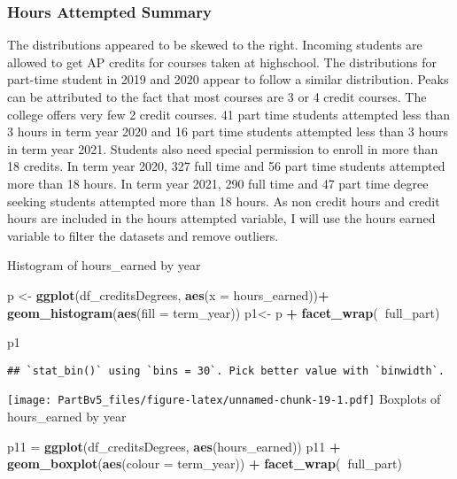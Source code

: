 \documentclass[]{article}
\newenvironment{Shaded}{\begin{snugshade}}{\end{snugshade}}
\newcommand{\DataTypeTok}[1]{\textcolor[rgb]{0.13,0.29,0.53}{#1}}
\newcommand{\KeywordTok}[1]{\textcolor[rgb]{0.13,0.29,0.53}{\textbf{#1}}}
\newcommand{\NormalTok}[1]{#1}
\newcommand{\OperatorTok}[1]{\textcolor[rgb]{0.81,0.36,0.00}{\textbf{#1}}}
\newcommand{\StringTok}[1]{\textcolor[rgb]{0.31,0.60,0.02}{#1}}
\begin{document}
\hypertarget{hours-attempted-summary}{%
\subsubsection{Hours Attempted Summary}\label{hours-attempted-summary}}

The distributions appeared to be skewed to the right. Incoming students
are allowed to get AP credits for courses taken at highschool. The
distributions for part-time student in 2019 and 2020 appear to follow a
similar distribution. Peaks can be attributed to the fact that most
courses are 3 or 4 credit courses. The college offers very few 2 credit
courses. 41 part time students attempted less than 3 hours in term year
2020 and 16 part time students attempted less than 3 hours in term year
2021. Students also need special permission to enroll in more than 18
credits. In term year 2020, 327 full time and 56 part time students
attempted more than 18 hours. In term year 2021, 290 full time and 47
part time degree seeking students attempted more than 18 hours. As non
credit hours and credit hours are included in the hours attempted
variable, I will use the hours earned variable to filter the datasets
and remove outliers.

Histogram of hours\_earned by year

\begin{Shaded}
\begin{Highlighting}[]
\NormalTok{p <-}\StringTok{ }\KeywordTok{ggplot}\NormalTok{(df_creditsDegrees, }\KeywordTok{aes}\NormalTok{(}\DataTypeTok{x =}\NormalTok{ hours_earned))}\OperatorTok{+}\StringTok{ }\KeywordTok{geom_histogram}\NormalTok{(}\KeywordTok{aes}\NormalTok{(}\DataTypeTok{fill =}\NormalTok{ term_year))}
\NormalTok{p1<-}\StringTok{ }\NormalTok{p }\OperatorTok{+}\StringTok{ }\KeywordTok{facet_wrap}\NormalTok{(}\OperatorTok{~}\NormalTok{full_part)}

\NormalTok{p1}
\end{Highlighting}
\end{Shaded}

\begin{verbatim}
## `stat_bin()` using `bins = 30`. Pick better value with `binwidth`.
\end{verbatim}

\texttt{[image: PartBv5\_files/figure-latex/unnamed-chunk-19-1.pdf]}
Boxplots of hours\_earned by year

\begin{Shaded}
\begin{Highlighting}[]
\NormalTok{p11 =}\StringTok{ }\KeywordTok{ggplot}\NormalTok{(df_creditsDegrees, }\KeywordTok{aes}\NormalTok{(hours_earned))}
\NormalTok{p11 }\OperatorTok{+}\StringTok{ }\KeywordTok{geom_boxplot}\NormalTok{(}\KeywordTok{aes}\NormalTok{(}\DataTypeTok{colour =}\NormalTok{ term_year)) }\OperatorTok{+}
\StringTok{       }\KeywordTok{facet_wrap}\NormalTok{(}\OperatorTok{~}\NormalTok{full_part)}
\end{Highlighting}
\end{Shaded}
\end{document}

